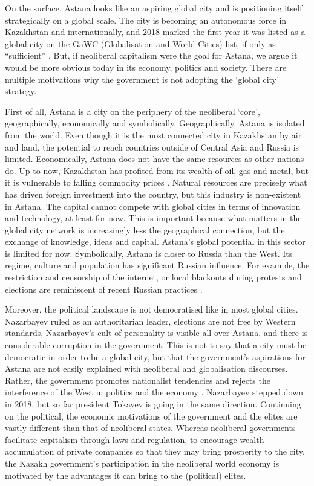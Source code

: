 \documentclass{article}
\begin{document}
On the surface, Astana looks like an aspiring global city and is positioning itself strategically on a global scale. The city is becoming an autonomous force in Kazakhstan and internationally, and 2018 marked the first year it was listed as a global city on the GaWC (Globalisation and World Cities) list, if only as ``sufficient'' \parencite{gawc2018list}. But, if neoliberal capitalism were the goal for Astana, we argue it would be more obvious today in its economy, politics and society. There are multiple motivations why the government is not adopting the `global city' strategy.

First of all, Astana is a city on the periphery of the neoliberal `core', geographically, economically and symbolically.  Geographically, Astana is isolated from the world. Even though it is the most connected city in Kazakhstan by air and land, the potential to reach countries outside of Central Asia and Russia is limited.
Economically, Astana does not have the same resources as other nations do. Up to now, Kazakhstan has profited from its wealth of oil, gas and metal, but it is vulnerable to falling commodity prices \parencite{batsaikhan2017central}. Natural resources are precisely what has driven foreign investment into the country, but this industry is non-existent in Astana. The capital cannot compete with global cities in terms of innovation and technology, at least for now. This is important because what matters in the global city network is increasingly less the geographical connection, but the exchange of knowledge, ideas and capital. Astana's global potential in this sector is limited for now.
Symbolically, Astana is closer to Russia than the West. Its regime, culture and population has significant Russian influence. For example, the restriction and censorship of the internet, or local blackouts during protests and elections are reminiscent of recent Russian practices \parencite{freedomhouse2021}.

Moreover, the political landscape is not democratised like in most global cities. Nazarbayev ruled as an authoritarian leader, elections are not free by Western standards, Nazarbayev's cult of personality is visible all over Astana, and there is considerable corruption in the government. This is not to say that a city must be democratic in order to be a global city, but that the government's aspirations for Astana are not easily explained with neoliberal and globalisation discourses. Rather, the government promotes nationalist tendencies and rejects the interference of the West in politics and the economy \parencite{koch2013not}. Nazarbayev stepped down in 2018, but so far president Tokayev is going in the same direction.
Continuing on the political, the economic motivations of the government and the elites are vastly different than that of neoliberal states. Whereas neoliberal governments facilitate capitalism through laws and regulation, to encourage wealth accumulation of private companies so that they may bring prosperity to the city, the Kazakh government's participation in the neoliberal world economy is motivated by the advantages it can bring to the (political) elites.
\end{document}

